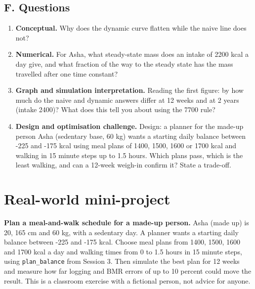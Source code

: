 \documentclass[11pt,a4paper]{article}
\begin{document}
\subsection*{F. Questions}
\begin{enumerate}[nosep]
\item \textbf{Conceptual.} Why does the dynamic curve flatten while the naive line does not?
\item \textbf{Numerical.} For Asha, what steady-state mass does an intake of 2200 kcal a day give, and what fraction of the way to the steady state has the mass travelled after one time constant?
\item \textbf{Graph and simulation interpretation.} Reading the first figure: by how much do the naive and dynamic answers differ at 12 weeks and at 2 years (intake 2400)? What does this tell you about using the 7700 rule?
\item \textbf{Design and optimisation challenge.} Design: a planner for the made-up person Asha (sedentary base, 60 kg) wants a starting daily balance between -225 and -175 kcal using meal plans of 1400, 1500, 1600 or 1700 kcal and walking in 15 minute steps up to 1.5 hours. Which plans pass, which is the least walking, and can a 12-week weigh-in confirm it? State a trade-off.
\end{enumerate}

\section{Real-world mini-project}
\textbf{Plan a meal-and-walk schedule for a made-up person.} Asha (made up) is 20, 165 cm and 60 kg, with a sedentary day. A planner wants a starting daily balance between -225 and -175 kcal. Choose meal plans from 1400, 1500, 1600 and 1700 kcal a day and walking times from 0 to 1.5 hours in 15 minute steps, using \texttt{plan\_balance} from Session 3. Then simulate the best plan for 12 weeks and measure how far logging and BMR errors of up to 10 percent could move the result. This is a classroom exercise with a fictional person, not advice for anyone.
\end{document}

